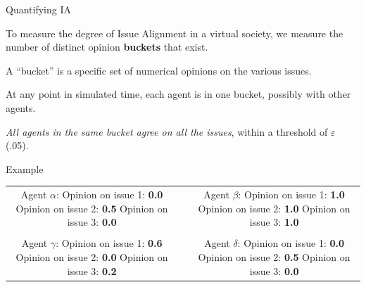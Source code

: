 \documentclass[12pt]{beamer}
\begin{document}
\begin{frame}[c]{Quantifying IA} %

To measure the degree of Issue Alignment in a virtual society, we measure the
number of distinct opinion \textbf{buckets} that exist.

\bigskip
\pause
A ``bucket'' is a specific set of numerical opinions on the various issues.

At any point in simulated time, each agent is in one bucket, possibly with
other agents.

\textit{All agents in the same bucket agree on all the issues}, within a
threshold of $\varepsilon$ (.05).

\end{frame}


\begin{frame}[c]{Example} %

\begin{center}
\begin{tabular}{cp{1cm}c}
\makecell{
\small Agent $\alpha$: \\
\footnotesize Opinion on issue 1: \textbf{0.0} \\
\footnotesize Opinion on issue 2: \textbf{0.5} \\
\footnotesize Opinion on issue 3: \textbf{0.0} \\
} & &
\makecell{
\small Agent $\beta$: \\
\footnotesize Opinion on issue 1: \textbf{1.0} \\
\footnotesize Opinion on issue 2: \textbf{1.0} \\
\footnotesize Opinion on issue 3: \textbf{1.0} \\
} \\
\smallskip \\
\makecell{
\small Agent $\gamma$: \\
\footnotesize Opinion on issue 1: \textbf{0.6} \\
\footnotesize Opinion on issue 2: \textbf{0.0} \\
\footnotesize Opinion on issue 3: \textbf{0.2} \\
} & &
\makecell{
\small Agent $\delta$: \\
\footnotesize Opinion on issue 1: \textbf{0.0} \\
\footnotesize Opinion on issue 2: \textbf{0.5} \\
\footnotesize Opinion on issue 3: \textbf{0.0} \\
} \\
\end{tabular}

\bigskip
\bigskip
\smallskip
{}
\end{center}
\end{frame}
\end{document}
